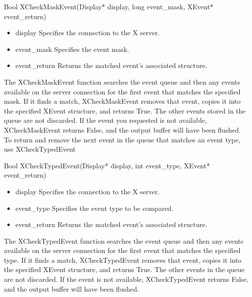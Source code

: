 \documentclass{report}
\begin{document}
\begin{itemize}
            \bigbreak \noindent 
            \begin{cppcode}
            Bool XCheckMaskEvent(Display* display, long event_mask, XEvent* event_return)
            \end{cppcode}
            \bigbreak \noindent
            \begin{itemize}
                \item display Specifies the connection to the X server.
                \item event\_mask Specifies the event mask.
                \item event\_return Returns the matched event’s associated structure.
            \end{itemize}
            The XCheckMaskEvent function searches the event queue and then any events available on the server connection for the first event that matches the specified mask. If it finds a match,
            \bigbreak \noindent 
            XCheckMaskEvent removes that event, copies it into the specified XEvent structure, and returns True. The other events stored in the queue are not discarded. If the event you requested is not available, XCheckMaskEvent returns False, and the output buffer will have been flushed.
            \bigbreak \noindent 
            To return and remove the next event in the queue that matches an event type, use XCheckTypedEvent
            \bigbreak \noindent 
            \begin{cppcode}
                Bool XCheckTypedEvent(Display* display, int event_type, XEvent* event_return)
            \end{cppcode}
            \bigbreak \noindent
            \begin{itemize}
                \item display Specifies the connection to the X server.
                \item event\_type Specifies the event type to be compared.
                \item event\_return Returns the matched event’s associated structure.
            \end{itemize}
            The XCheckTypedEvent function searches the event queue and then any events available on the server connection for the first event that matches the specified type. If it finds a match, XCheckTypedEvent removes that event, copies it into the specified XEvent structure, and returns True. The other events in the queue are not discarded. If the event is not available, XCheckTypedEvent returns False, and the output buffer will have been flushed.

\end{itemize}
\end{document}
